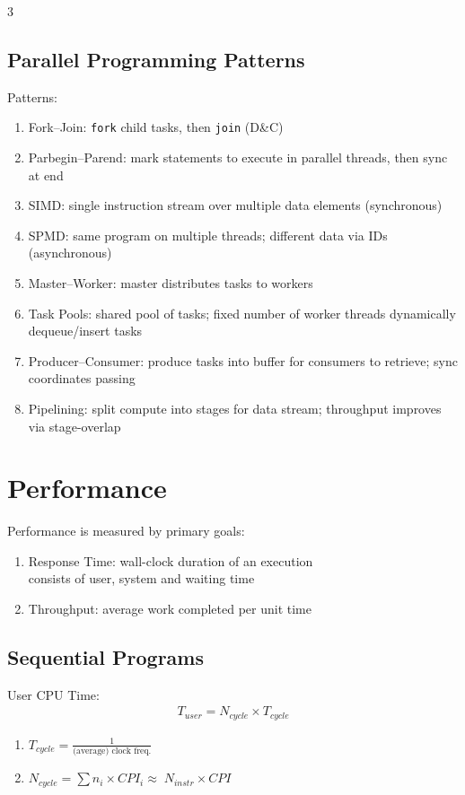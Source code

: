 \documentclass[12pt, a4paper]{article}
\begin{document}
\begin{multicols*}{3}
\subsection{Parallel Programming Patterns}
Patterns:
\begin{enumerate}[\roman*.]
  \item Fork--Join: \lstinline|fork| child tasks, then \lstinline|join| (D\&C)
  \item Parbegin--Parend: mark statements to execute in parallel threads, then sync at end
  \item SIMD: single instruction stream over multiple data elements (synchronous)
  \item SPMD: same program on multiple threads; different data via IDs (asynchronous)
  \item Master--Worker: master distributes tasks to workers
  \item Task Pools: shared pool of tasks; fixed number of worker threads dynamically dequeue/insert tasks
  \item Producer--Consumer: produce tasks into buffer for consumers to retrieve; sync coordinates passing 
  \item Pipelining: split compute into stages for data stream; throughput improves via stage-overlap
\end{enumerate}
\vspace{-1em}
\colbreak
\section{Performance}
Performance is measured by primary goals:
\begin{enumerate}[\roman*.]
  \item Response Time: wall-clock duration of an execution\\ 
    consists of user, system and waiting time
  \item Throughput: average work completed per unit time
\end{enumerate}

\subsection{Sequential Programs}
User CPU Time:
\begin{gather*}
  T_{user} = N_{cycle}\times T_{cycle}
\end{gather*}
\begin{enumerate}[\roman*.]
  \item $ T_{cycle} = \frac{1}{\text{(average) clock freq.}}$
  \item $ N_{cycle} = \sum n_i\times CPI_i\approx\; N_{instr}\times CPI$
\end{enumerate}\vspace{1em}


\end{multicols*}
\end{document}
